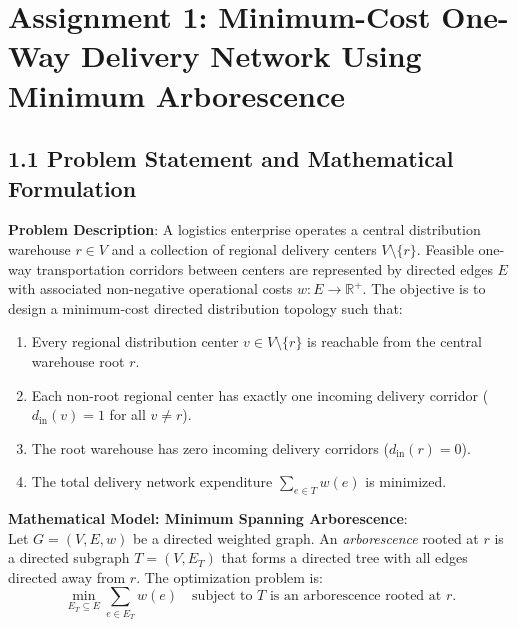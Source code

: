 \documentclass[12pt]{article}
\begin{document}
\section*{Assignment 1: Minimum-Cost One-Way Delivery Network Using Minimum Arborescence}

\subsection*{1.1 Problem Statement and Mathematical Formulation}
\textbf{Problem Description}: A logistics enterprise operates a central distribution warehouse $r \in V$ and a collection of regional delivery centers $V \setminus \{r\}$. Feasible one-way transportation corridors between centers are represented by directed edges $E$ with associated non-negative operational costs $w: E \to \mathbb{R}^+$. The objective is to design a minimum-cost directed distribution topology such that:
\begin{enumerate}
    \item Every regional distribution center $v \in V \setminus \{r\}$ is reachable from the central warehouse root $r$.
    \item Each non-root regional center has exactly one incoming delivery corridor ($d_{\text{in}}(v) = 1$ for all $v \neq r$).
    \item The root warehouse has zero incoming delivery corridors ($d_{\text{in}}(r) = 0$).
    \item The total delivery network expenditure $\sum_{e \in T} w(e)$ is minimized.
\end{enumerate}

\textbf{Mathematical Model: Minimum Spanning Arborescence}:\\
Let $G = (V, E, w)$ be a directed weighted graph. An \textit{arborescence} rooted at $r$ is a directed subgraph $T = (V, E_T)$ that forms a directed tree with all edges directed away from $r$. The optimization problem is:
\[
\min_{E_T \subseteq E} \sum_{e \in E_T} w(e) \quad \text{subject to } T \text{ is an arborescence rooted at } r.
\]
\end{document}
